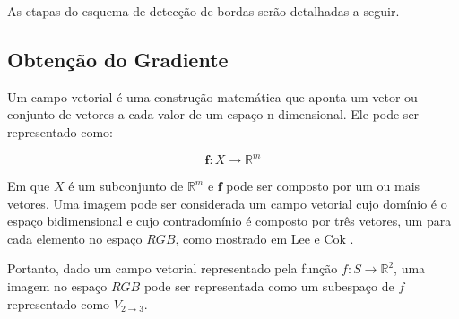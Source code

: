 As etapas do esquema de detecção de bordas serão detalhadas a seguir.





\subsection{Obtenção do Gradiente}


Um campo vetorial é uma construção matemática que aponta um vetor ou conjunto de vetores a cada valor de um espaço n-dimensional. Ele pode ser representado como:

$$ \textbf{f}:X \rightarrow \mathbb{R}^m $$

Em que $X$ é um subconjunto de $\mathbb{R}^m$ e $\textbf{f}$ pode ser composto por um ou mais vetores. Uma imagem pode ser considerada um campo vetorial cujo domínio é o espaço bidimensional e cujo contradomínio é composto por três vetores, um para cada elemento no espaço $RGB$, como mostrado em Lee e Cok \cite{borda00}.

Portanto, dado um campo vetorial representado pela função $ f: S \to \mathbb{R}^2 $, uma imagem no espaço $RGB$ pode ser representada como um subespaço de $f$ representado como $ V_{2 \to 3} $.




